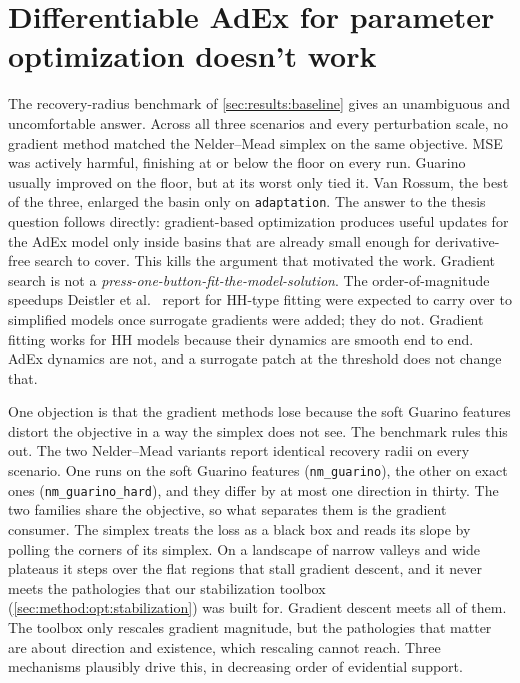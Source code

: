 \section{Differentiable AdEx for parameter optimization doesn't work}\label{sec:discussion:diffadex}

The recovery-radius benchmark of \cref{sec:results:baseline} gives an unambiguous and uncomfortable answer.
Across all three scenarios and every perturbation scale, no gradient method matched the Nelder--Mead simplex on the same objective.
\gls{MSE} was actively harmful, finishing at or below the floor on every run.
Guarino usually improved on the floor, but at its worst only tied it.
Van Rossum, the best of the three, enlarged the basin only on \texttt{adaptation}.
The answer to the thesis question follows directly: gradient-based optimization produces useful updates for the \gls{AdEx}
model only inside basins that are already small enough for derivative-free search to cover.
This kills the argument that motivated the work.
Gradient search is not a \emph{press-one-button-fit-the-model-solution}.
The order-of-magnitude speedups Deistler et al.~\cite{Deistler2025} report for \gls{HH}-type fitting were expected to carry over to simplified models once surrogate gradients were added; they do not.
Gradient fitting works for \gls{HH} models because their dynamics are smooth end to end.
\gls{AdEx} dynamics are not, and a surrogate patch at the threshold does not change that.

One objection is that the gradient methods lose because the soft Guarino features distort the objective in a way the simplex does not see.
The benchmark rules this out.
The two Nelder--Mead variants report identical recovery radii on every scenario.
One runs on the soft Guarino features (\texttt{nm\_guarino}), the other on exact ones (\texttt{nm\_guarino\_hard}), and they differ by at most one direction in thirty.
The two families share the objective, so what separates them is the gradient consumer.
The simplex treats the loss as a black box and reads its slope by polling the corners of its simplex.
On a landscape of narrow valleys and wide plateaus it steps over the flat regions that stall gradient descent,
and it never meets the pathologies that our stabilization toolbox (\cref{sec:method:opt:stabilization}) was built for.
Gradient descent meets all of them.
The toolbox only rescales gradient magnitude, but the pathologies that matter are about direction and existence, which rescaling cannot reach.
Three mechanisms plausibly drive this, in decreasing order of evidential support.

